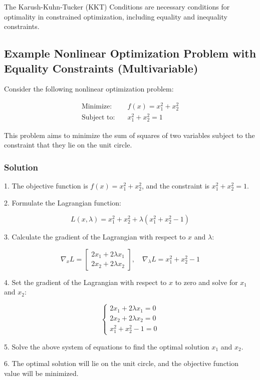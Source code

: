 \documentclass[a4paper]{article}
\begin{document}
The Karush-Kuhn-Tucker (KKT) Conditions are necessary conditions for optimality in constrained optimization, including equality and inequality constraints.

\subsection{Example Nonlinear Optimization Problem with Equality Constraints (Multivariable)}

Consider the following nonlinear optimization problem:


\begin{align*}
\text{Minimize:} \quad & f(x) = x_1^2 + x_2^2 \\
\text{Subject to:} \quad & x_1^2 + x_2^2 = 1
\end{align*}


This problem aims to minimize the sum of squares of two variables subject to the constraint that they lie on the unit circle.

\subsubsection{Solution}

1. The objective function is \(f(x) = x_1^2 + x_2^2\), and the constraint is \(x_1^2 + x_2^2 = 1\).

2. Formulate the Lagrangian function:

\[
L(x, \lambda) = x_1^2 + x_2^2 + \lambda(x_1^2 + x_2^2 - 1)
\]

3. Calculate the gradient of the Lagrangian with respect to \(x\) and \(\lambda\):

\[
\nabla_x L = \begin{bmatrix} 2x_1 + 2\lambda x_1 \\ 2x_2 + 2\lambda x_2 \end{bmatrix}, \quad \nabla_\lambda L = x_1^2 + x_2^2 - 1
\]

4. Set the gradient of the Lagrangian with respect to \(x\) to zero and solve for \(x_1\) and \(x_2\):

\[
\begin{cases}
2x_1 + 2\lambda x_1 = 0 \\
2x_2 + 2\lambda x_2 = 0 \\
x_1^2 + x_2^2 - 1 = 0
\end{cases}
\]

5. Solve the above system of equations to find the optimal solution \(x_1\) and \(x_2\).

6. The optimal solution will lie on the unit circle, and the objective function value will be minimized.
\end{document}
